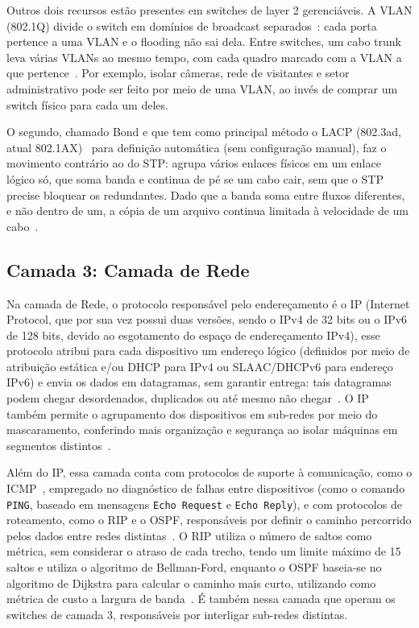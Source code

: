 Outros dois recursos estão presentes em switches de layer 2 gerenciáveis. A VLAN (802.1Q) divide o switch em domínios de broadcast separados~\cite{ieee8021q}: cada porta pertence a uma VLAN e o flooding não sai dela. Entre switches, um cabo trunk leva várias VLANs ao mesmo tempo, com cada quadro marcado com a VLAN a que pertence~\cite{ieee8021q}. Por exemplo, isolar câmeras, rede de visitantes e setor administrativo pode ser feito por meio de uma VLAN, ao invés de comprar um switch físico para cada um deles.

O segundo, chamado Bond e que tem como principal método o LACP (802.3ad, atual 802.1AX)~\cite{ieee8021ax,linkAggregation} para definição automática (sem configuração manual), faz o movimento contrário ao do STP: agrupa vários enlaces físicos em um enlace lógico só, que soma banda e continua de pé se um cabo cair, sem que o STP precise bloquear os redundantes. Dado que a banda soma entre fluxos diferentes, e não dentro de um, a cópia de um arquivo continua limitada à velocidade de um cabo~\cite{linkAggregation}.

\subsection{Camada 3: Camada de Rede}
Na camada de Rede, o protocolo responsável pelo endereçamento é o IP (Internet Protocol, que por sua vez possui duas versões, sendo o IPv4 de 32 bits ou o IPv6 de 128 bits, devido ao esgotamento do espaço de endereçamento IPv4), esse protocolo atribui para cada dispositivo um endereço lógico (definidos por meio de atribuição estática e/ou DHCP para IPv4 ou SLAAC/DHCPv6 para endereço IPv6) e envia os dados em datagramas, sem garantir entrega: tais datagramas podem chegar desordenados, duplicados ou até mesmo não chegar~\cite{wikipedia2026ip}. O IP também permite o agrupamento dos dispositivos em sub-redes por meio do mascaramento, conferindo mais organização e segurança ao isolar máquinas em segmentos distintos~\cite{wikipedia2026subnet}.

Além do IP, essa camada conta com protocolos de suporte à comunicação, como o ICMP~\cite{icmp, wikipedia2026icmp}, empregado no diagnóstico de falhas entre dispositivos (como o comando \texttt{PING}, baseado em mensagens \texttt{Echo Request} e \texttt{Echo Reply}), e com protocolos de roteamento, como o RIP e o OSPF, responsáveis por definir o caminho percorrido pelos dados entre redes distintas~\cite{RIPandOSPF}. O RIP utiliza o número de saltos como métrica, sem considerar o atraso de cada trecho, tendo um limite máximo de 15 saltos e utiliza o algoritmo de Bellman-Ford, enquanto o OSPF baseia-se no algoritmo de Dijkstra para calcular o caminho mais curto, utilizando como métrica de custo a largura de banda~\cite{RIPandOSPF}. É também nessa camada que operam os switches de camada 3, responsáveis por interligar sub-redes distintas.

